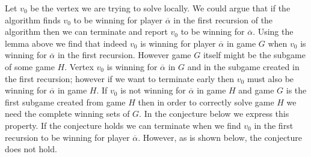 Let $v_0$ be the vertex we are trying to solve locally. We could argue that if the algorithm finds $v_0$ to be winning for player $\overline{\alpha}$ in the first recursion of the algorithm then we can terminate and report $v_0$ to be winning for $\overline{\alpha}$. Using the lemma above we find that indeed $v_0$ is winning for player $\overline{\alpha}$ in game $G$ when $v_0$ is winning for $\overline{\alpha}$ in the first recursion. However game $G$ itself might be the subgame of some game $H$. Vertex $v_0$ is winning for $\overline{\alpha}$ in $G$ and in the subgame created in the first recursion; however if we want to terminate early then $v_0$ must also be winning for $\overline{\alpha}$ in game $H$. If $v_0$ is not winning for $\overline{\alpha}$ in game $H$ and game $G$ is the first subgame created from game $H$ then in order to correctly solve game $H$ we need the complete winning sets of $G$. In the conjecture below we express this property. If the conjecture holds we can terminate when we find $v_0$ in the first recursion to be winning for player $\overline{\alpha}$. However, as is shown below, the conjecture does not hold.
